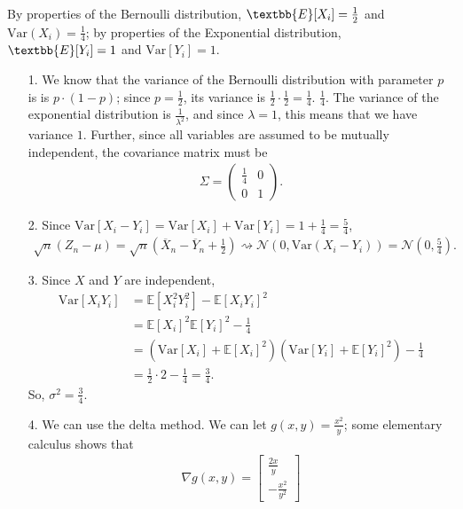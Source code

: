 \documentclass[a4paper]{article}
\begin{document}
\begin{Solution}
	By properties of the Bernoulli distribution, $\textbb{E}[X_i] = \frac{1}{2}$ and $\text{Var}(X_i) = \frac{1}{4}$; by properties of the Exponential distribution, $\textbb{E}[Y_i] = 1$ and $\text{Var}[Y_i] = 1$.
	\begin{itemize}
		\item[1.] We know that the variance of the Bernoulli distribution with parameter $p$ is is $p \cdot (1 - p)$; since $p = \frac{1}{2}$, its variance is $\frac{1}{2} \cdot \frac{1}{2} = \frac{1}{4}$. $\frac{1}{4}$. The variance of the exponential distribution is $\frac{1}{\lambda^2}$, and since $\lambda = 1$, this means that we have variance $1$. Further, since all variables are assumed to be mutually independent, the covariance matrix must be
			\begin{align*}
				\Sigma = \begin{pmatrix}
					\frac{1}{4} & 0 \\
					0 & 1
				\end{pmatrix}.
			\end{align*}
		\item[2.] Since $\text{Var}[X_i - Y_i] = \text{Var}[X_i] + \text{Var}[Y_i] = 1 + \frac{1}{4} = \frac{5}{4}$,
			\begin{align*}
			\sqrt{n}(Z_n - \mu) = \sqrt{n} \left( \overline{X}_n - \overline{Y}_n + \frac{1}{2} \right) \rightsquigarrow \mathcal{N}(0, \text{Var}(X_i - Y_i)) = \mathcal{N} \left(0, \frac{5}{4} \right).
			\end{align*}
		\item[3.] Since $X$ and $Y$ are independent, 
			\begin{align*}
				\text{Var}[X_i Y_i] &= \mathbb{E}[X_i^2Y_i^2] - \mathbb{E}[X_iY_i]^2
			\\ &= \mathbb{E}[X_i]^2 \mathbb{E}[Y_i]^2 - \frac{1}{4}
			\\ &= \left( \text{Var}[X_i] + \mathbb{E}[X_i]^2 \right) \left(\text{Var}[Y_i] + \mathbb{E}[Y_i]^2 \right) - \frac{1}{4} 
			\\ &= \frac{1}{2} \cdot 2 - \frac{1}{4} = \frac{3}{4}.
			\end{align*}
			So, $\sigma^2 = \frac{3}{4}.$
		\item[4.] We can use the delta method. We can let $g(x, y) = \frac{x^2}{y}$; some elementary calculus shows that
			\begin{align*}
				\nabla g(x, y) = \begin{bmatrix}
					\frac{2x}{y} \\ -\frac{x^2}{y^2}

\end{bmatrix}
\end{align*}
\end{itemize}
\end{Solution}
\end{document}

